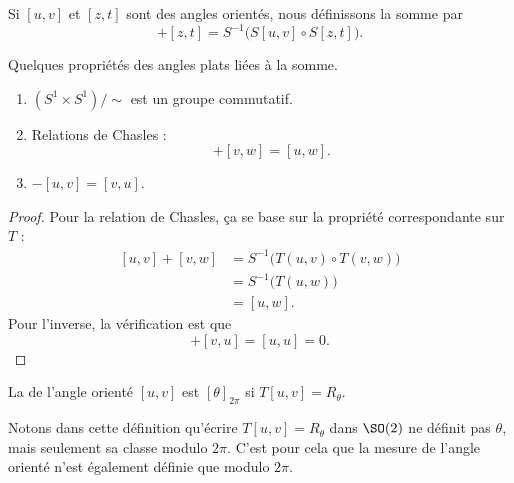 \begin{definition}
	Si \( [u,v]\) et \( [z,t]\) sont des angles orientés, nous définissons la somme par
	\begin{equation}
		[u,v]+[z,t]=S^{-1}\Big( S[u,v]\circ S[z,t] \Big).
	\end{equation}
\end{definition}

\begin{lemma}       \label{LEMooWISVooYsStJp}
	Quelques propriétés des angles plats liées à la somme.
	\begin{enumerate}
		\item
		      \( (S^1\times S^1)/\sim\) est un groupe commutatif.
		\item       \label{ITEMooBKTFooWbEvIU}
		      Relations de Chasles :
		      \begin{equation}
			      [u,v]+[v,w]=[u,w].
		      \end{equation}
		\item
		      \( -[u,v]=[v,u]\).
	\end{enumerate}
\end{lemma}

\begin{proof}
	Pour la relation de Chasles, ça se base sur la propriété correspondante sur \( T\) :
	\begin{subequations}
		\begin{align}
			[u,v]+[v,w] & =S^{-1}\Big( T(u,v)\circ T(v,w) \Big) \\
			            & =S^{-1}\big( T(u,w) \big)             \\
			            & =[u,w].
		\end{align}
	\end{subequations}
	Pour l'inverse, la vérification est que
	\begin{equation}
		[u,v]+[v,u]=[u,u]=0.
	\end{equation}
\end{proof}

\begin{definition}      \label{DEFooFLGNooCZUkHY}
	La  de l'angle orienté \( [u,v]\) est \( [\theta]_{2\pi}\) si \( T[u,v]=R_{\theta}\).
\end{definition}
Notons dans cette définition qu'écrire \( T[u,v]=R_{\theta}\) dans \( \SO(2)\) ne définit pas \( \theta\), mais seulement sa classe modulo \( 2\pi\). C'est pour cela que la mesure de l'angle orienté n'est également définie que modulo \( 2\pi\).

